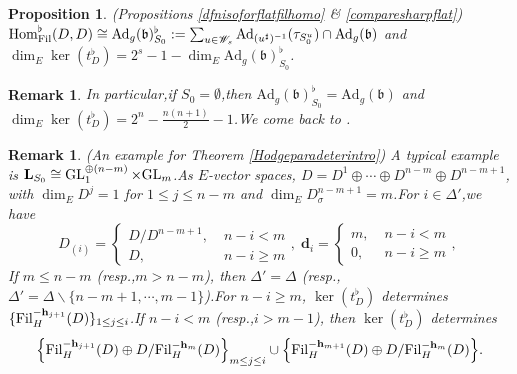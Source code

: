 \documentclass[10pt]{article}
\newtheorem{pro}[thm]{Proposition}
\newtheorem{rmk}[thm]{Remark}
\DeclareMathOperator{\GL}{GL}
\newcommand{\fil}{{\rm Fil}}
\newcommand{\homo}{{\rm Hom}}
\newcommand{\GLN}{{\rm GL}}
\newcommand{\bL}{{\mathbf{L}}}
\newcommand{\bh}{{\mathbf{h}}}
\newcommand{\bd}{{\mathbf{d}}}
\newcommand{\fb}{{\mathfrak{b}}}
\newcommand{\sW}{\mathscr W}
\begin{document}
\begin{pro}\label{introforhomoflat}(Propositions \ref{dfnisoforflatfilhomo} \& \ref{comparesharpflat})
	$\homo^{\flat}_{\fil}(D,D)\cong \mathrm{Ad}_{g}(\fb)_{S_0}^{\flat}:=\sum_{u\in \sW_s}\mathrm{Ad}_{(u^{\sharp})^{-1}}(\tau_{S^u_0})\cap \mathrm{Ad}_{g}(\fb)$ and 
$\dim_E\ker(t^{\flat}_{D})=2^s-1-\dim_E\mathrm{Ad}_{g}(\fb)_{S_0}^{\flat}$.\;
\end{pro}
\begin{rmk}In particular,\;if $S_0=\emptyset$,\;then $\mathrm{Ad}_{g}(\fb)_{S_0}^{\flat}=\mathrm{Ad}_{g}(\fb)$ and $\dim_E\ker(t^{\flat}_{D})=2^n-\frac{n(n+1)}{2}-1$.\;We come back to \cite{ParaDing2024}.\;
\end{rmk}	 











\begin{rmk}\label{rmkintroII} (An example for Theorem \ref{Hodgeparadeterintro}) A typical example is $\bL_{S_0}\cong \GL_1^{\oplus (n-m)}\times \GLN_m$.\;As $E$-vector spaces, $D=D^1\oplus\cdots\oplus D^{n-m}\oplus D^{n-m+1}$, with $\dim_ED^j=1$ for $1\leq j\leq n-m$ and $\dim_ED
		_{\sigma}^{n-m+1}=m$.\;For $i\in \Delta'$,\;we have
		\begin{equation}
			D_{(i)}=\left\{
			\begin{array}{ll}
				D/D^{n-m+1},\;&n-i<m\\
				D ,\;&n-i\geq m
			\end{array}
			\right.,\;\bd_{i}=\left\{
			\begin{array}{ll}
				m,\;&n-i<m\\
				0,\;&n-i\geq m
			\end{array}
			\right.,\;
		\end{equation}
		If $m\leq n-m$ (resp.,\;$m>n-m$), then $\Delta'=\Delta$ (resp.,\;$\Delta'=\Delta\backslash \{n-m+1,\cdots,m-1\}$).\;For $n-i\geq m$, $\ker(t^{\flat}_{D})$ determines $\{\fil_H^{-\bh_{j+1}}(D)\}_{1\leq j\leq i}$.\;If $n-i<m$ (resp.,\;$i>m-1$), then $\ker(t^{\flat}_{D})$ determines
		\begin{equation}
			\begin{aligned}
				\Big\{\fil_H^{-\bh_{j+1}}(D)\oplus D/\fil_H^{-\bh_{m}}(D)\Big\}_{m \leq j\leq i}\cup \Big\{\fil_H^{-\bh_{m+1}}(D)\oplus D/\fil_H^{-\bh_{m}}(D)\Big\}.
			\end{aligned}
		\end{equation}	
\end{rmk}
\end{document}
